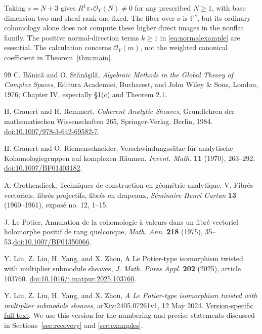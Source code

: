 \documentclass[11pt,reqno]{amsart}
\numberwithin{equation}{section}
\theoremstyle{definition}
\theoremstyle{remark}
\newcommand{\OO}{\mathcal O}
\newcommand{\PP}{\mathbb P}
\begin{document}
Taking $s=N+3$ gives $R^1\pi_*\OO_Y(N)\neq0$ for any prescribed $N\geq1$, with base dimension two and sheaf rank one fixed. The fiber over $o$ is $\PP^s$, but its ordinary cohomology alone does not compute these higher direct images in the nonflat family. The positive normal-direction terms $k\geq1$ in \eqref{eq:normalexample} are essential. The calculation concerns $\OO_Y(m)$, not the weighted canonical coefficient in Theorem~\ref{thm:main}.

\begin{thebibliography}{99}
C. B\u anic\u a and O. St\u an\u a\c sil\u a,
\emph{Algebraic Methods in the Global Theory of Complex Spaces},
Editura Academiei, Bucharest, and John Wiley \& Sons, London, 1976;
Chapter IV, especially \S1(c) and Theorem 2.1.

H. Grauert and R. Remmert, \emph{Coherent Analytic Sheaves}, Grundlehren der mathematischen Wissenschaften 265, Springer-Verlag, Berlin, 1984.
\href{https://doi.org/10.1007/978-3-642-69582-7}{doi:10.1007/978-3-642-69582-7}.

H. Grauert and O. Riemenschneider, Verschwindungss\"atze f\"ur analytische Kohomologiegruppen auf komplexen R\"aumen,
\emph{Invent. Math.} \textbf{11} (1970), 263--292.
\href{https://doi.org/10.1007/BF01403182}{doi:10.1007/BF01403182}.

A. Grothendieck, Techniques de construction en g\'eom\'etrie analytique. V. Fibr\'es vectoriels, fibr\'es projectifs, fibr\'es en drapeaux,
\emph{S\'eminaire Henri Cartan} \textbf{13} (1960--1961), expos\'e no. 12, 1--15.

J. Le Potier, Annulation de la cohomologie \`a valeurs dans un fibr\'e vectoriel holomorphe positif de rang quelconque,
\emph{Math. Ann.} \textbf{218} (1975), 35--53.\newline\href{https://doi.org/10.1007/BF01350066}{doi:10.1007/BF01350066}.

Y. Liu, Z. Liu, H. Yang, and X. Zhou,
A Le Potier-type isomorphism twisted with multiplier submodule sheaves,
\emph{J. Math. Pures Appl.} \textbf{202} (2025), article 103760.
\href{https://doi.org/10.1016/j.matpur.2025.103760}{doi:10.1016/j.matpur.2025.103760}.

Y. Liu, Z. Liu, H. Yang, and X. Zhou,
\emph{A Le Potier-type isomorphism twisted with multiplier submodule sheaves},
arXiv:2405.07261v1, 12 May 2024.
\href{https://arxiv.org/html/2405.07261v1}{Version-specific full text}.
We use this version for the numbering and precise statements discussed in
Sections~\ref{sec:recovery} and \ref{sec:examples}.


\end{thebibliography}
\end{document}
